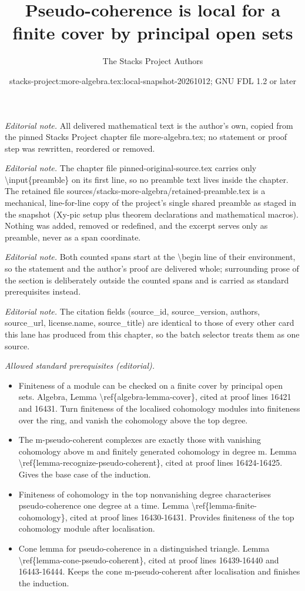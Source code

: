 \documentclass[10pt,a4paper]{amsart}
\title{Pseudo-coherence is local for a finite cover by principal open sets}
\author{The Stacks Project Authors}
\date{stacks-project:more-algebra.tex:local-snapshot-20261012; GNU FDL 1.2 or later}
\theoremstyle{plain}
\theoremstyle{definition}
\theoremstyle{remark}
\numberwithin{equation}{subsection}
\begin{document}
\maketitle
\setcounter{subsection}{1}
\noindent\textit{Editorial note.} All delivered mathematical text is the author's own, copied from the pinned Stacks Project chapter file more-algebra.tex; no statement or proof step was rewritten, reordered or removed.\par\medskip
\noindent\textit{Editorial note.} The chapter file pinned-original-source.tex carries only \textbackslash{}input\{preamble\} on its first line, so no preamble text lives inside the chapter. The retained file sources/stacks-more-algebra/retained-preamble.tex is a mechanical, line-for-line copy of the project's single shared preamble as staged in the snapshot (Xy-pic setup plus theorem declarations and mathematical macros). Nothing was added, removed or redefined, and the excerpt serves only as preamble, never as a span coordinate.\par\medskip
\noindent\textit{Editorial note.} Both counted spans start at the \textbackslash{}begin line of their environment, so the statement and the author's proof are delivered whole; surrounding prose of the section is deliberately outside the counted spans and is carried as standard prerequisites instead.\par\medskip
\noindent\textit{Editorial note.} The citation fields (source\_id, source\_version, authors, source\_url, license.name, source\_title) are identical to those of every other card this lane has produced from this chapter, so the batch selector treats them as one source.\par\medskip
\noindent\textit{Allowed standard prerequisites (editorial).}\begin{itemize}
\item Finiteness of a module can be checked on a finite cover by principal open sets. Algebra, Lemma \textbackslash{}ref\{algebra-lemma-cover\}, cited at proof lines 16421 and 16431. Turn finiteness of the localised cohomology modules into finiteness over the ring, and vanish the cohomology above the top degree.
\item The m-pseudo-coherent complexes are exactly those with vanishing cohomology above m and finitely generated cohomology in degree m. Lemma \textbackslash{}ref\{lemma-recognize-pseudo-coherent\}, cited at proof lines 16424-16425. Gives the base case of the induction.
\item Finiteness of cohomology in the top nonvanishing degree characterises pseudo-coherence one degree at a time. Lemma \textbackslash{}ref\{lemma-finite-cohomology\}, cited at proof lines 16430-16431. Provides finiteness of the top cohomology module after localisation.
\item Cone lemma for pseudo-coherence in a distinguished triangle. Lemma \textbackslash{}ref\{lemma-cone-pseudo-coherent\}, cited at proof lines 16439-16440 and 16443-16444. Keeps the cone m-pseudo-coherent after localisation and finishes the induction.
\end{itemize}\medskip
\end{document}
